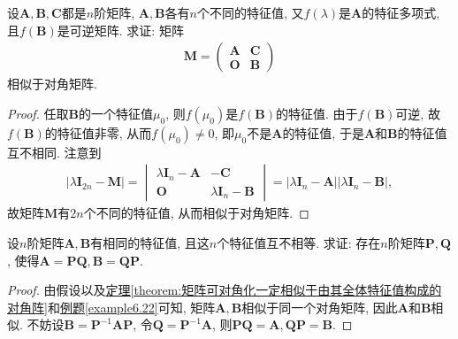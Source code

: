 \documentclass[../../main.tex]{subfiles}
\begin{document}
\begin{example}
设$\boldsymbol{A},\boldsymbol{B},\boldsymbol{C}$都是$n$阶矩阵, $\boldsymbol{A},\boldsymbol{B}$各有$n$个不同的特征值, 又$f(\lambda)$是$\boldsymbol{A}$的特征多项式, 且$f(\boldsymbol{B})$是可逆矩阵. 求证: 矩阵
\begin{align*}
\boldsymbol{M}=\begin{pmatrix}
\boldsymbol{A}&\boldsymbol{C}\\
\boldsymbol{O}&\boldsymbol{B}
\end{pmatrix}
\end{align*}
相似于对角矩阵.
\end{example}
\begin{proof}
任取$\boldsymbol{B}$的一个特征值$\mu_0$, 则$f(\mu_0)$是$f(\boldsymbol{B})$的特征值. 由于$f(\boldsymbol{B})$可逆, 故$f(\boldsymbol{B})$的特征值非零, 从而$f(\mu_0)\neq 0$, 即$\mu_0$不是$\boldsymbol{A}$的特征值, 于是$\boldsymbol{A}$和$\boldsymbol{B}$的特征值互不相同. 注意到
\begin{align*}
|\lambda\boldsymbol{I}_{2n}-\boldsymbol{M}|=\begin{vmatrix}
\lambda\boldsymbol{I}_n-\boldsymbol{A}&-\boldsymbol{C}\\
\boldsymbol{O}&\lambda\boldsymbol{I}_n-\boldsymbol{B}
\end{vmatrix}=|\lambda\boldsymbol{I}_n-\boldsymbol{A}||\lambda\boldsymbol{I}_n-\boldsymbol{B}|,
\end{align*}
故矩阵$\boldsymbol{M}$有$2n$个不同的特征值, 从而相似于对角矩阵.
\end{proof}

\begin{example}
设$n$阶矩阵$\boldsymbol{A},\boldsymbol{B}$有相同的特征值, 且这$n$个特征值互不相等. 求证: 存在$n$阶矩阵$\boldsymbol{P},\boldsymbol{Q}$, 使得$\boldsymbol{A}=\boldsymbol{P}\boldsymbol{Q}, \boldsymbol{B}=\boldsymbol{Q}\boldsymbol{P}$.~
\end{example}
\begin{proof}
由假设以及\hyperref[theorem:矩阵可对角化一定相似于由其全体特征值构成的对角阵]{定理\ref{theorem:矩阵可对角化一定相似于由其全体特征值构成的对角阵}}和\hyperref[example6.22]{例题\ref{example6.22}}可知, 矩阵$\boldsymbol{A},\boldsymbol{B}$相似于同一个对角矩阵, 因此$\boldsymbol{A}$和$\boldsymbol{B}$相似. 不妨设$\boldsymbol{B}=\boldsymbol{P}^{-1}\boldsymbol{A}\boldsymbol{P}$, 令$\boldsymbol{Q}=\boldsymbol{P}^{-1}\boldsymbol{A}$, 则$\boldsymbol{P}\boldsymbol{Q}=\boldsymbol{A}, \boldsymbol{Q}\boldsymbol{P}=\boldsymbol{B}$. 
\end{proof}
\end{document}
